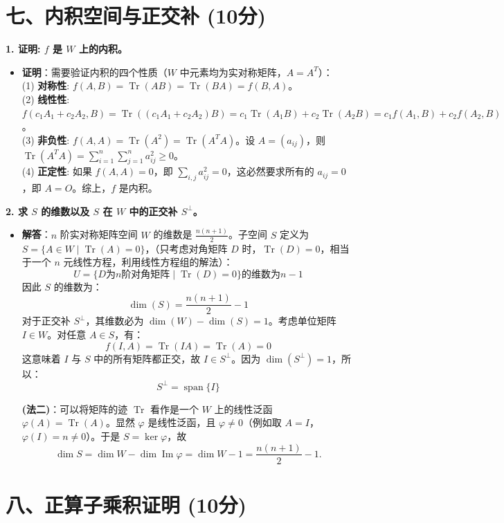 \documentclass[12pt,a4paper]{article}
\DeclareMathOperator{\Tr}{Tr}
\DeclareMathOperator{\Span}{span}
\DeclareMathOperator{\Img}{Im}
\begin{document}
\section*{七、内积空间与正交补 (10分)}

\textbf{1. 证明: $f$ 是 $W$ 上的内积。}
\begin{itemize}
    \item \textbf{证明}：需要验证内积的四个性质（$W$ 中元素均为实对称矩阵，$A = A^T$）：\\
    (1) \textbf{对称性}: $f(A,B) = \Tr(AB) = \Tr(BA) = f(B,A)$。\\
    (2) \textbf{线性性}: $f(c_1A_1 + c_2A_2, B) = \Tr((c_1A_1 + c_2A_2)B) = c_1\Tr(A_1B) + c_2\Tr(A_2B) = c_1f(A_1, B) + c_2f(A_2, B)$。\\
    (3) \textbf{非负性}: $f(A,A) = \Tr(A^2) = \Tr(A^T A)$。设 $A = (a_{ij})$，则 $\Tr(A^T A) = \sum_{i=1}^n \sum_{j=1}^n a_{ij}^2 \ge 0$。\\
    (4) \textbf{正定性}: 如果 $f(A,A) = 0$，即 $\sum_{i,j} a_{ij}^2 = 0$，这必然要求所有的 $a_{ij} = 0$，即 $A = O$。综上，$f$ 是内积。
\end{itemize}

\textbf{2. 求 $S$ 的维数以及 $S$ 在 $W$ 中的正交补 $S^\perp$。}
\begin{itemize}
    \item \textbf{解答}：$n$ 阶实对称矩阵空间 $W$ 的维数是 $\frac{n(n+1)}{2}$。子空间 $S$ 定义为 $S = \{A \in W \mid \Tr(A) = 0\}$，（只考虑对角矩阵 $D$ 时，$\Tr(D) = 0$，相当于一个 $n$ 元线性方程，利用线性方程组的解法）：
    $$ U = \{ D \text{为} n \text{阶对角矩阵} \mid \Tr(D) = 0 \} \text{的维数为} n-1 $$
    因此 $S$ 的维数为：
    $$ \dim(S) = \frac{n(n+1)}{2} - 1 $$
    对于正交补 $S^\perp$，其维数必为 $\dim(W) - \dim(S) = 1$。考虑单位矩阵 $I \in W$。对任意 $A \in S$，有：
    $$ f(I,A) = \Tr(IA) = \Tr(A) = 0 $$
    这意味着 $I$ 与 $S$ 中的所有矩阵都正交，故 $I \in S^\perp$。因为 $\dim(S^\perp) = 1$，所以：
    $$ S^\perp = \Span\{I\} $$
    
    \textbf{(法二)}：可以将矩阵的迹 $\Tr$ 看作是一个 $W$ 上的线性泛函 $\varphi(A) = \Tr(A)$。显然 $\varphi$ 是线性泛函，且 $\varphi \neq 0$（例如取 $A=I$，$\varphi(I)=n \neq 0$）。于是 $S = \ker\varphi$，故
    $$ \dim S = \dim W - \dim\Img\varphi = \dim W - 1 = \frac{n(n+1)}{2} - 1. $$
\end{itemize}


\section*{八、正算子乘积证明 (10分)}
\end{document}
